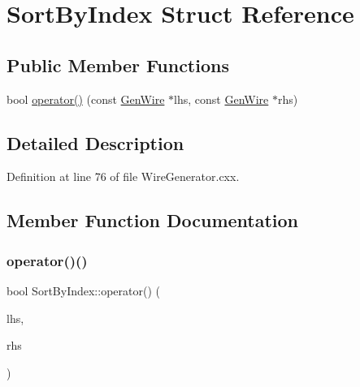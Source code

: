 \hypertarget{struct_sort_by_index}{}\section{Sort\+By\+Index Struct Reference}
\label{struct_sort_by_index}
\subsection*{Public Member Functions}
\begin{DoxyCompactItemize}
\item 
bool \hyperlink{struct_sort_by_index_ad0c929afcad7ad7b625ee89add8f09d0}{operator()} (const \hyperlink{class_wire_cell_1_1_gen_wire}{Gen\+Wire} $\ast$lhs, const \hyperlink{class_wire_cell_1_1_gen_wire}{Gen\+Wire} $\ast$rhs)
\end{DoxyCompactItemize}


\subsection{Detailed Description}


Definition at line 76 of file Wire\+Generator.\+cxx.



\subsection{Member Function Documentation}
\mbox{\label{struct_sort_by_index_ad0c929afcad7ad7b625ee89add8f09d0}} 
\subsubsection{\texorpdfstring{operator()()}{operator()()}}
{\footnotesize\ttfamily bool Sort\+By\+Index\+::operator() (\begin{DoxyParamCaption}\item[{const \hyperlink{class_wire_cell_1_1_gen_wire}{Gen\+Wire} $\ast$}]{lhs,  }\item[{const \hyperlink{class_wire_cell_1_1_gen_wire}{Gen\+Wire} $\ast$}]{rhs }\end{DoxyParamCaption})\hspace{0.3cm}{\ttfamily [inline]}}



